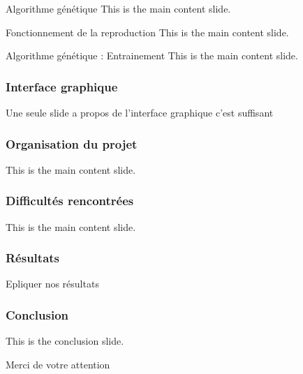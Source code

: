 \documentclass{beamer}
\begin{document}
\begin{frame}{Algorithme génétique}
    This is the main content slide.
\end{frame}

\begin{frame}{Fonctionnement de la reproduction}
    This is the main content slide.
\end{frame}

\begin{frame}{Algorithme génétique : Entrainement}
    This is the main content slide.
\end{frame}

\begin{frame}
    \frametitle{Interface graphique}
    Une seule slide a propos de l'interface graphique c'est suffisant
\end{frame}

\begin{frame}
    \frametitle{Organisation du projet}
    This is the main content slide.
\end{frame}

\begin{frame}
    \frametitle{Difficultés rencontrées}
    This is the main content slide.
\end{frame}

\begin{frame}
    \frametitle{Résultats}
    Epliquer nos résultats
\end{frame}

\begin{frame}
    \frametitle{Conclusion}
    This is the conclusion slide.
\end{frame}

\begin{frame}{}
    \begin{center}
        \Huge Merci de votre attention
    \end{center}
\end{frame}
\end{document}
